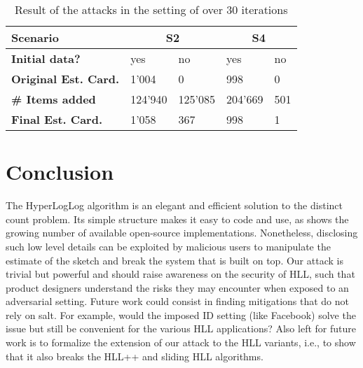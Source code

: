 \documentclass{IEEEtran}
\begin{document}
\begin{table}[h]
\caption{Result of the attacks in the setting of \cite{hllvuln} over 30 iterations}
\begin{tabular}{| m{8.5em} | m{4em} | m{4em} | m{4em} | m{4em} |}
    \hline
    \textbf{Scenario} & \multicolumn{2}{c|}{S2} & \multicolumn{2}{c|}{S4} \\ \hline
    \textbf{Initial data?} & yes & no & yes & no \\ \hline
    \textbf{Original Est. Card.} & 1'004 & 0 & 998 & 0 \\ \hline
    \textbf{\# Items added} & 124'940 & 125'085 & 204'669 & 501 \\ \hline
    \textbf{Final Est. Card.} & 1'058 & 367 & 998 & 1 \\ \hline
\end{tabular}
\label{table:tab2}
\end{table}

\section{Conclusion}\label{sec:conclusions}
The HyperLogLog algorithm is an elegant and efficient solution to the distinct count problem. Its simple structure makes it easy to code and use, as shows the growing number of available open-source implementations. Nonetheless, disclosing such low level details can be exploited by malicious users to manipulate the estimate of the sketch and break the system that is built on top. Our attack is trivial but powerful and should raise awareness on the security of HLL, such that product designers understand the risks they may encounter when exposed to an adversarial setting. Future work could consist in finding mitigations that do not rely on salt. For example, would the imposed ID setting (like Facebook) solve the issue but still be convenient for the various HLL applications? Also left for future work is to formalize the extension of our attack to the HLL variants, i.e., to show that it also breaks the HLL++ \cite{hllpratice} and sliding HLL \cite{slidinghll} algorithms.



\end{document}
